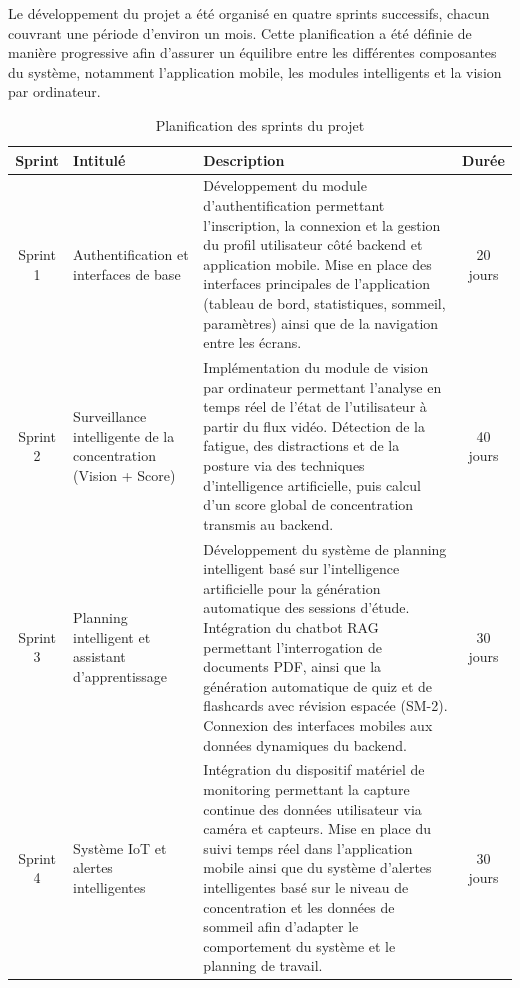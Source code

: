 Le développement du projet a été organisé en quatre sprints successifs, chacun couvrant une période d’environ un mois. Cette planification a été définie de manière progressive afin d’assurer un équilibre entre les différentes composantes du système, notamment l’application mobile, les modules intelligents et la vision par ordinateur.
{\singlespacing
\begin{table}[H]
\centering
\small
\renewcommand{\arraystretch}{1.2}
\setlength{\tabcolsep}{5pt}

\begin{tabularx}{\textwidth}{|c|p{3.8cm}|X|c|}
\hline
\textbf{Sprint} & \textbf{Intitulé} & \textbf{Description} & \textbf{Durée} \\
\hline

Sprint 1 & 
Authentification et interfaces de base & 
Développement du module d’authentification permettant l’inscription, la connexion et la gestion du profil utilisateur côté backend et application mobile. Mise en place des interfaces principales de l’application (tableau de bord, statistiques, sommeil, paramètres) ainsi que de la navigation entre les écrans. &
20 jours \\ \hline

Sprint 2 & 
Surveillance intelligente de la concentration (Vision + Score) & 
Implémentation du module de vision par ordinateur permettant l’analyse en temps réel de l’état de l’utilisateur à partir du flux vidéo. Détection de la fatigue, des distractions et de la posture via des techniques d’intelligence artificielle, puis calcul d’un score global de concentration transmis au backend. &
40 jours \\ \hline

Sprint 3 & 
Planning intelligent et assistant d’apprentissage & 
Développement du système de planning intelligent basé sur l’intelligence artificielle pour la génération automatique des sessions d’étude. Intégration du chatbot RAG permettant l’interrogation de documents PDF, ainsi que la génération automatique de quiz et de flashcards avec révision espacée (SM-2). Connexion des interfaces mobiles aux données dynamiques du backend. &
30 jours \\ \hline

Sprint 4 & 
Système IoT et alertes intelligentes & 
Intégration du dispositif matériel de monitoring permettant la capture continue des données utilisateur via caméra et capteurs. Mise en place du suivi temps réel dans l’application mobile ainsi que du système d’alertes intelligentes basé sur le niveau de concentration et les données de sommeil afin d’adapter le comportement du système et le planning de travail. &
30 jours \\ \hline

\end{tabularx}

\caption{Planification des sprints du projet}
\label{tab:sprints_final}
\end{table}
}
